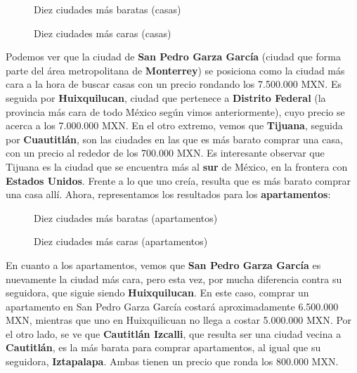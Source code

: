 \documentclass[
10pt, %
a4paper, %
oneside, %
headinclude,footinclude, %
BCOR5mm, %
]{scrartcl}
\begin{document}
    \begin{figure}[H]
        \caption{Diez ciudades m\'as baratas (casas)}
        \label{fig:precio-ciudades-baratas-casas}
    \end{figure}
    
    \begin{figure}[H]
        \caption{Diez ciudades m\'as caras (casas)}
        \label{fig:precio-ciudades-caras-casas}
    \end{figure}
    
    Podemos ver que la ciudad de \textbf{San Pedro Garza Garc\'ia} (ciudad que forma parte del \'area metropolitana de \textbf{Monterrey}) se posiciona como la ciudad m\'as cara a la hora de buscar casas con un precio rondando los 7.500.000 MXN. Es seguida por \textbf{Huixquilucan}, ciudad que pertenece a \textbf{Distrito Federal} (la provincia m\'as cara de todo M\'exico seg\'un vimos anteriormente), cuyo precio se acerca a los 7.000.000 MXN.
    \vskip 2mm
    En el otro extremo, vemos que \textbf{Tijuana}, seguida por \textbf{Cuautitl\'an}, son las ciudades en las que es m\'as barato comprar una casa, con un precio al rededor de los 700.000 MXN. Es interesante observar que Tijuana es la ciudad que se encuentra m\'as al \textbf{sur} de M\'exico, en la frontera con \textbf{Estados Unidos}. Frente a lo que uno cre\'ia, resulta que es m\'as barato comprar una casa all\'i.
    \vskip 2mm
    Ahora, representamos los resultados para los \textbf{apartamentos}:
    
    \begin{figure}[H]
        \caption{Diez ciudades m\'as baratas (apartamentos)}
        \label{fig:precio-ciudades-baratas-apartamentos}
    \end{figure}
    
    \begin{figure}[H]
        \caption{Diez ciudades m\'as caras (apartamentos)}
        \label{fig:precio-ciudades-caras-apartamentos}
    \end{figure}
    
    En cuanto a los apartamentos, vemos que \textbf{San Pedro Garza Garc\'ia} es nuevamente la ciudad m\'as cara, pero esta vez, por mucha diferencia contra su seguidora, que siguie siendo \textbf{Huixquilucan}. En este caso, comprar un apartamento en San Pedro Garza Garc\'ia costar\'a aproximadamente 6.500.000 MXN, mientras que uno en Huixquilicuan no llega a costar 5.000.000 MXN.
    \vskip 2mm
    Por el otro lado, se ve que \textbf{Cautitl\'an Izcalli}, que resulta ser una ciudad vecina a \textbf{Cautitl\'an}, es la m\'as barata para comprar apartamentos, al igual que su seguidora, \textbf{Iztapalapa}. Ambas tienen un precio que ronda los 800.000 MXN.
\end{document}
